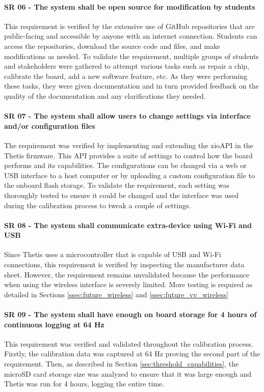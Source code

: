 \paragraph*{SR 06 - The system shall be open source for modification by students} This requirement is verified by the extensive use of GitHub repositories that are public-facing and accessible by anyone with an internet connection.
Students can access the repositories, download the source code and files, and make modifications as needed.
To validate the requirement, multiple groups of students and stakeholders were gathered to attempt various tasks such as repair a chip, calibrate the board, add a new software feature, etc.
As they were performing these tasks, they were given documentation and in turn provided feedback on the quality of the documentation and any clarifications they needed.

\paragraph*{SR 07 - The system shall allow users to change settings via interface and/or configuration files} The requirement was verified by implementing and extending the xioAPI in the Thetis firmware.
This API provides a suite of settings to control how the board performs and its capabilities.
The configurations can be changed via a web or USB interface to a host computer or by uploading a custom configuration file to the onboard flash storage.
To validate the requirement, each setting was thoroughly tested to ensure it could be changed and the interface was used during the calibration process to tweak a couple of settings.

\paragraph*{SR 08 - The system shall communicate extra-device using Wi-Fi and USB} Since Thetis uses a microcontroller that is capable of USB and Wi-Fi connections, this requirement is verified by inspecting the manufacturer data sheet.
However, the requirement remains unvalidated because the performance when using the wireless interface is severely limited.
More testing is required as detailed in Sections \ref{ssec:future_wireless} and \ref{ssec:future_vv_wireless}

\paragraph*{SR 09 - The system shall have enough on board storage for 4 hours of continuous logging at 64 Hz} This requirement was verified and validated throughout the calibration process.
Firstly, the calibration data was captured at 64 Hz proving the second part of the requirement.
Then, as described in Section \ref{sec:threshold_capabilities}, the microSD card storage size was analyzed to ensure that it was large enough and Thetis was run for 4 hours, logging the entire time.